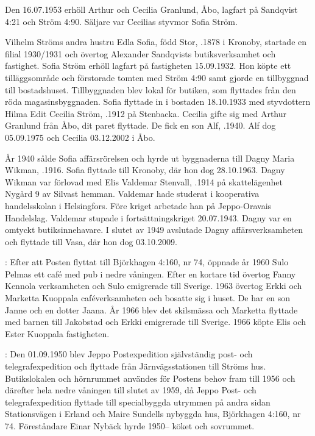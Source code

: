 Den 16.07.1953 erhöll Arthur och Cecilia Granlund, Åbo, lagfart	på Sandqvist 4:21 och Ström 4:90. Säljare var Cecilias styvmor Sofia	Ström.


Vilhelm Ströms andra hustru Edla Sofia, född Stor, .1878 i Kronoby, startade en filial 1930/1931 och övertog Alexander Sandqvists butiksverksamhet och fastighet. Sofia Ström erhöll lagfart på fastigheten 15.09.1932. Hon köpte ett tilläggsområde och förstorade tomten med Ström 4:90 samt gjorde en tillbyggnad till bostadshuset. Tillbyggnaden blev lokal för butiken, som flyttades från den röda magasinsbyggnaden. Sofia flyttade in i bostaden 18.10.1933 med styvdottern Hilma Edit Cecilia Ström, .1912 på Stenbacka. Cecilia gifte sig med Arthur Granlund från Åbo, dit paret flyttade. De fick en son Alf, .1940. Alf dog 05.09.1975 och Cecilia 03.12.2002 i Åbo.

	År 1940 sålde Sofia affärsrörelsen och hyrde ut byggnaderna till Dagny Maria Wikman, .1916. Sofia flyttade till Kronoby, där hon dog 28.10.1963. Dagny Wikman var förlovad med Elis Valdemar Stenvall, .1914 på skattelägenhet Nygård 9 av Silvast hemman. Valdemar hade studerat i kooperativa handelsskolan i	Helsingfors. Före kriget arbetade han på Jeppo-Oravais Handelslag. Valdemar stupade i fortsättningskriget 20.07.1943. Dagny var en	omtyckt butiksinnehavare. I slutet av 1949 avslutade Dagny affärsverksamheten och flyttade till Vasa, där hon dog 03.10.2009.



:  Efter att Posten flyttat till Björkhagen 4:160, nr 74, öppnade år 1960 Sulo Pelmas ett café med pub i nedre våningen. Efter	en kortare tid övertog Fanny Kennola verksamheten och Sulo emigrerade till Sverige. 1963 övertog Erkki och Marketta Kuoppala	caféverksamheten och bosatte sig i huset. De har en son Janne och en dotter Jaana. År 1966 blev det skilsmässa och Marketta flyttade med barnen till Jakobstad och Erkki emigrerade till Sverige. 1966 köpte Elis	och Ester Kuoppala fastigheten.

:  Den 01.09.1950 blev Jeppo Postexpedition självständig post- och telegrafexpedition och flyttade från Järnvägsstationen till Ströms hus.	Butikslokalen och hörnrummet användes för Postens behov fram till	1956 och därefter hela nedre våningen till slutet av 1959, då Jeppo Post- och telegrafexpedition flyttade till specialbyggda utrymmen på	andra sidan Stationsvägen i Erland och Maire Sundells nybyggda hus,	Björkhagen 4:160, nr 74. Föreståndare Einar Nybäck hyrde 1950-- köket och sovrummet.


